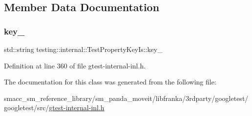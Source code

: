 \subsection{Member Data Documentation}
\mbox{\label{classtesting_1_1internal_1_1TestPropertyKeyIs_a857f42b8753df8efccc8f38196b150b9}} 
\subsubsection{\texorpdfstring{key\+\_\+}{key\_}}
{\footnotesize\ttfamily std\+::string testing\+::internal\+::\+Test\+Property\+Key\+Is\+::key\+\_\+\hspace{0.3cm}{\ttfamily [private]}}



Definition at line 360 of file gtest-\/internal-\/inl.\+h.



The documentation for this class was generated from the following file\+:\begin{DoxyCompactItemize}
\item 
smacc\+\_\+sm\+\_\+reference\+\_\+library/sm\+\_\+panda\+\_\+moveit/libfranka/3rdparty/googletest/googletest/src/\hyperlink{gtest-internal-inl_8h}{gtest-\/internal-\/inl.\+h}\end{DoxyCompactItemize}
